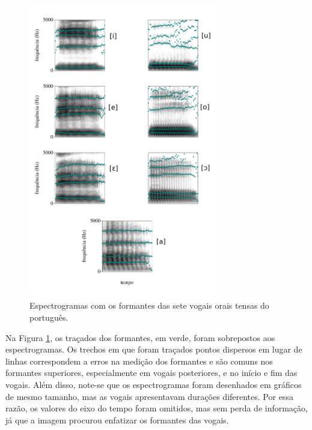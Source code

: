 \documentclass[portuguese]{textolivre}
\begin{document}
\begin{figure}[H]
 \centering
 \includegraphics[width=0.73\textwidth]{Fig12.pdf}
 \caption{Espectrogramas com os formantes das sete vogais orais tensas do português.}
 \label{fig12}
\end{figure}

Na Figura \ref{fig12}, os traçados dos formantes, em verde, foram sobrepostos aos espectrogramas. Os trechos em que foram traçados pontos dispersos em lugar de linhas correspondem a erros na medição dos formantes e são comuns nos formantes superiores, especialmente em vogais posteriores, e no início e fim das vogais. Além disso, note-se que os espectrogramas foram desenhados em gráficos de mesmo tamanho, mas as vogais apresentavam durações diferentes. Por essa razão, os valores do eixo do tempo foram omitidos, mas sem perda de informação, já que a imagem procurou enfatizar os formantes das vogais. 
\end{document}
